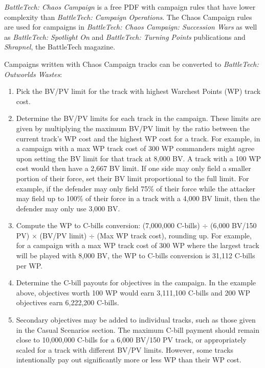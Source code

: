 \emph{BattleTech: Chaos Campaign} is a free PDF with campaign rules that have lower complexity than \emph{BattleTech: Campaign Operations}.
The Chaos Campaign rules are used for campaigns in \emph{BattleTech: Chaos Campaign: Succession Wars} as well as \emph{BattleTech: Spotlight On} and \emph{BattleTech: Turning Points} publications and \emph{Shrapnel}, the BattleTech magazine.

Campaigns written with Chaos Campaign tracks can be converted to \emph{BattleTech: Outworlds Wastes}:

\begin{enumerate}

\item Pick the BV/PV limit for the track with highest Warchest Points (WP) track cost.

\item Determine the BV/PV limits for each track in the campaign.
These limits are given by multiplying the maximum BV/PV limit by the ratio between the current track's WP cost and the highest WP cost for a track.
For example, in a campaign with a max WP track cost of 300 WP commanders might agree upon setting the BV limit for that track at 8,000 BV.
A track with a 100 WP cost would then have a 2,667 BV limit.
If one side may only field a smaller portion of their force, set their BV limit proportional to the full limit.
For example, if the defender may only field 75\% of their force while the attacker may field up to 100\% of their force in a track with a 4,000 BV limit, then the defender may only use 3,000 BV.

\item Compute the WP to C-bills conversion: (7,000,000 C-bills) $\div$ (6,000 BV/150 PV) $\times$ (BV/PV limit) $\div$ (Max WP track cost), rounding up.
For example, for a campaign with a max WP track cost of 300 WP where the largest track will be played with 8,000 BV, the WP to C-bills conversion is 31,112 C-bills per WP.
\item Determine the C-bill payouts for objectives in the campaign.
In the example above, objectives worth 100 WP would earn 3,111,100 C-bills and 200 WP objectives earn 6,222,200 C-bills.

\item Secondary objectives may be added to individual tracks, such as those given in the Casual Scenarios section.
The maximum C-bill payment should remain close to 10,000,000 C-bills for a 6,000 BV/150 PV track, or appropriately scaled for a track with different BV/PV limits.
However, some tracks intentionally pay out significantly more or less WP than their WP cost.


\end{enumerate}
